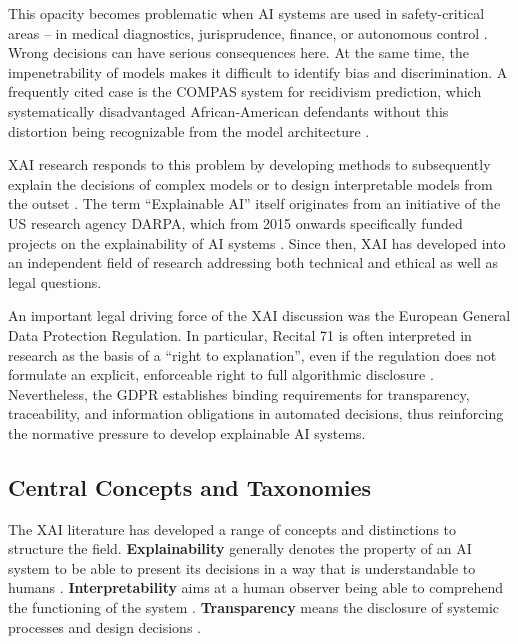 \documentclass[
  12pt,
  a4paper,
  oneside,
  titlepage
]{article}
\begin{document}
This opacity becomes problematic when AI systems are used in 
safety-critical areas – in medical diagnostics, jurisprudence, finance, 
or autonomous control \citep[ p.~80800]{Ortigossa2024}. Wrong decisions 
can have serious consequences here. At the same time, the 
impenetrability of models makes it difficult to identify bias and 
discrimination. A frequently cited case is the COMPAS system for 
recidivism prediction, which systematically disadvantaged 
African-American defendants without this distortion being recognizable 
from the model architecture \citep[ p.~84]{BarredoArrieta2020}.

XAI research responds to this problem by developing methods to 
subsequently explain the decisions of complex models or to design 
interpretable models from the outset \citep{Mersha2024}. The term 
\enquote{Explainable AI} itself originates from an initiative of the 
US research agency DARPA, which from 2015 onwards specifically funded 
projects on the explainability of AI systems \citep[ p.~86]{BarredoArrieta2020}. 
Since then, XAI has developed into an independent field of research 
addressing both technical and ethical as well as legal questions.

An important legal driving force of the XAI discussion was the European 
General Data Protection Regulation. In particular, Recital 71 is often 
interpreted in research as the basis of a \enquote{right to explanation}, 
even if the regulation does not formulate an explicit, enforceable 
right to full algorithmic disclosure \citep{Wachter2017}. Nevertheless, 
the GDPR establishes binding requirements for transparency, 
traceability, and information obligations in automated decisions, thus 
reinforcing the normative pressure to develop explainable AI systems.

\subsection{Central Concepts and Taxonomies}

The XAI literature has developed a range of concepts and distinctions 
to structure the field. \textbf{Explainability} generally denotes the 
property of an AI system to be able to present its decisions in a way 
that is understandable to humans \citep[ p.~89]{BarredoArrieta2020}. 
\textbf{Interpretability} aims at a human observer being able to 
comprehend the functioning of the system \citep[ p.~25]{Weller2019}. 
\textbf{Transparency} means the disclosure of systemic processes and 
design decisions \citep[ p.~27]{Weller2019}.
\end{document}
